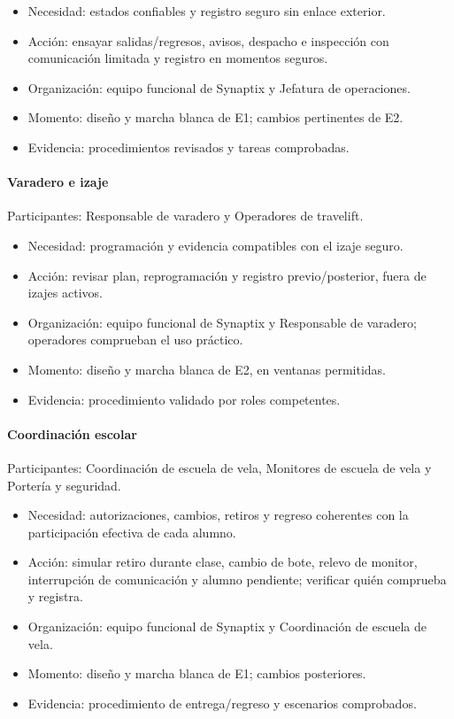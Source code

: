 \begin{itemize}
  \setlength{\itemsep}{2pt}
  \setlength{\parsep}{0pt}
  \item Necesidad: estados confiables y registro seguro sin enlace exterior.
  \item Acción: ensayar salidas/regresos, avisos, despacho e inspección con comunicación limitada y registro en momentos seguros.
  \item Organización: equipo funcional de Synaptix y Jefatura de operaciones.
  \item Momento: diseño y marcha blanca de E1; cambios pertinentes de E2.
  \item Evidencia: procedimientos revisados y tareas comprobadas.
\end{itemize}

\paragraph{Varadero e izaje}
\mbox{}\par
\noindent Participantes: Responsable de varadero y Operadores de travelift.

\begin{itemize}
  \setlength{\itemsep}{2pt}
  \setlength{\parsep}{0pt}
  \item Necesidad: programación y evidencia compatibles con el izaje seguro.
  \item Acción: revisar plan, reprogramación y registro previo/posterior, fuera de izajes activos.
  \item Organización: equipo funcional de Synaptix y Responsable de varadero; operadores comprueban el uso práctico.
  \item Momento: diseño y marcha blanca de E2, en ventanas permitidas.
  \item Evidencia: procedimiento validado por roles competentes.
\end{itemize}

\paragraph{Coordinación escolar}
\mbox{}\par
\noindent Participantes: Coordinación de escuela de vela, Monitores de escuela de vela y Portería y seguridad.

\begin{itemize}
  \setlength{\itemsep}{2pt}
  \setlength{\parsep}{0pt}
  \item Necesidad: autorizaciones, cambios, retiros y regreso coherentes con la participación efectiva de cada alumno.
  \item Acción: simular retiro durante clase, cambio de bote, relevo de monitor, interrupción de comunicación y alumno pendiente; verificar quién comprueba y registra.
  \item Organización: equipo funcional de Synaptix y Coordinación de escuela de vela.
  \item Momento: diseño y marcha blanca de E1; cambios posteriores.
  \item Evidencia: procedimiento de entrega/regreso y escenarios comprobados.
\end{itemize}


